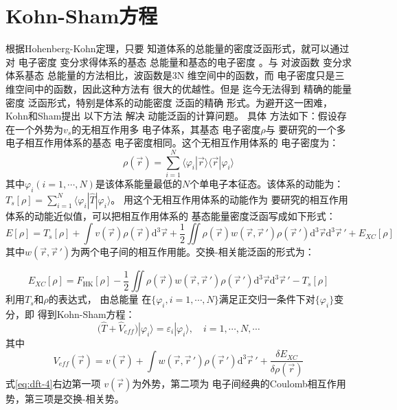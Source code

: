 \section{Kohn-Sham方程}
{根据}Hohenberg-Kohn定理，只要%
{知道}体系的总能量的{密度}泛函形式，就可以通过对%
{电}子密度%
变分求得体系的基态%
{总能量和基态的电}子密度%
。与%
对波函数%
变分求%
体系基态%
{总能量}的方法相比，波函数是3N%
{维空间中的}函数，而%
{电}子密度只是三维{空间中的}函数，因此这种方法有%
{很}大的优越性。但是%
{迄今无法}得到%
精确的能量密度
泛函形式，特别是体系的动能密度
泛函的精确%
{形式。为避开这一困难}，Kohn和Sham\cite{PRA140-1133_1965}提出%
{以下}方法%
解决%
动能泛函的计算问题。%
具体%
方法如下：假设存在一个外势为$v_s$的无相互作用多%
{电}子体系，其基态%
{电}子密度$\rho$与%
{要}研究的一个多电子相互作用体系的基态%
{电}子密度相同。这个无相互作用体系的%
{电}子密度为：
$$\rho(\vec{r})=\sum_{i=1}^{N}\langle\varphi_{i}|\vec{r}\rangle\langle\vec{r}|\varphi_{i}\rangle$$
其中$\varphi_i(i\!=\!1,\cdots,N)$是该体系能量最低的$N$个{单电子}本征态。该体系的动能为：\linebreak $T_{s}[\rho]\!=\!\sum\limits_{i=1}^{N}\langle\varphi_{i}|\hat{T}|\varphi_{i}\rangle$。
用这个无相互作用体系的动能作为%
{要}研究的相互作用体系的动能近似{值}，可以把相互作用体系的%
{基态能量密度泛函}写成如下形式：
\begin{equation}
  \label{eq:dft-1}
E[\rho]=T_{s}[\rho]+\int{v(\vec{r})\rho(\vec{r})\textrm{d}^3\vec{r}}+\frac 12\iint{\rho(\vec{r})w(\vec{r},\vec r\,')\rho(\vec r\,')\textrm{d}^3\vec{r}\textrm{d}^3\vec r\,'}+E_{XC}[\rho]
\end{equation}
其中{$w(\vec r, \vec r\,')$为两个电子间的相互作用能。}交换-相关能泛函的形式为：

\begin{equation} 
  \label{eq:dft-2}
  E_{XC}[\rho]=F_{\mathrm{HK}}[\rho]-\frac 12\iint{\rho(\vec{r}) w(\vec{r},\vec r\,')\rho(\vec r\,')\textrm{d}^3\vec{r}\textrm{d}^3\vec r\,'}-T_{s}[\rho]
\end{equation}
利用$T_s$和$\rho$的表达式，%
{由}总能量%
{在$\{\varphi_i, i\!=\!1,\cdots, N\}$满足正交归一条件下对$\{\varphi_i\}$}变分，即%
得到Kohn-Sham方程：
\begin{equation} \label{eq:dft-3}
  \bigl(\hat{T}+\hat{V}_{e\!f\!f}\bigr)|\varphi_{i}\rangle=\varepsilon_{i}|\varphi_{i}\rangle{,\quad i=1,\cdots,N,\cdots}
\end{equation}
其中
\begin{equation} \label{eq:dft-4}
  V_{e\!f\!f}(\vec{r})={v}(\vec{r})+\int{w(\vec{r},\vec r\,')\rho(\vec r\,')\textrm{d}^3{\vec r\,'}+\frac{\delta E_{XC}}{\delta\rho(\vec{r})
}}
\end{equation}
式\eqref{eq:dft-4}右边第一项%
${v}(\vec{r})
$为外势，第二项为%
{电}子间经典的{Coulomb}相互作用势，第三项是交换-相关势。%

